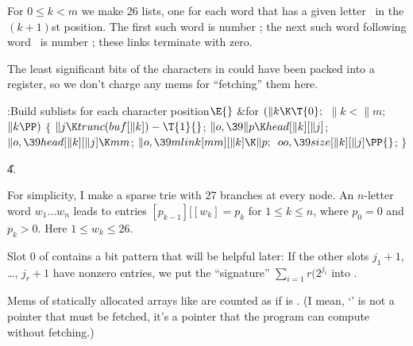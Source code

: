 For $0\le k<m$ we make 26 lists, one for each
word that has a given
letter~
in the $(k+1)$st position. The first such word is  number
; the next such word following word~ is number
; these links terminate with zero.

The least significant bits of the characters in  could have been
packed into a register, so we don't charge any mems for ``fetching'' them here.

\Y\B\4:Build sublists for each character position\X${}\E{}$\6
\&{for} ${}(\|k\K\T{0};{}$ ${}\|k<\|m;{}$ ${}\|k\PP){}$\5
${}\{{}$\1\6
${}\|j\K\\{trunc}(\\{buf}[\|k])-\T{1}{}$;\6
${}\|o,\39\|p\K\\{head}[\|k][\|j]{}$;\6
${}\|o,\39\\{head}[\|k][\|j]\K\\{mm}{}$;\6
${}\|o,\39\\{mlink}[\\{mm}][\|k]\K\|p;{}$\6
${}\\{oo},\39\\{size}[\|k][\|j]\PP{}$;\6
\4${}\}{}$\2\par
\U4.\fi

For simplicity, I make a sparse trie with 27
branches at every node.
An $n$-letter word $w_1\ldots w_n$ leads to entries
$[p_{k-1}][[w_k]=p_k$ for $1\le k\le n$, where $p_0=0$ and
$p_k>0$.
Here $1\le w_k\le 26$.

Slot 0 of  contains a bit pattern that will be helpful later:
If the other slots $j_1+1$, \dots, $j_r+1$ have nonzero entries,
we put the ``signature'' $\sum_{i=1}r\bigl(2^{j_i}$ into .

Mems of statically allocated arrays like 
are counted as if  is .
(I mean,
`' is not a pointer that must be fetched, it's a pointer
that the program can compute without fetching.)

